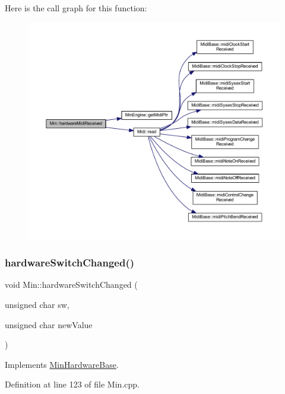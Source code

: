 Here is the call graph for this function\+:
\nopagebreak
\begin{figure}[H]
\begin{center}
\leavevmode
\includegraphics[width=350pt]{dd/d34/class_min_a8d4ebe4e020e14c2457d42f33c4c9e32_cgraph}
\end{center}
\end{figure}
\mbox{\label{class_min_ae00f275ac6aeb73f932e62ae85abe5b1}} 
\subsubsection{\texorpdfstring{hardware\+Switch\+Changed()}{hardwareSwitchChanged()}}
{\footnotesize\ttfamily void Min\+::hardware\+Switch\+Changed (\begin{DoxyParamCaption}\item[{unsigned char}]{sw,  }\item[{unsigned char}]{new\+Value }\end{DoxyParamCaption})\hspace{0.3cm}{\ttfamily [virtual]}}



Implements \hyperlink{class_min_hardware_base_a782fcaa265c084be39b509bd289dc42f}{Min\+Hardware\+Base}.



Definition at line 123 of file Min.\+cpp.

